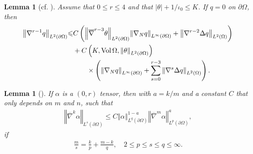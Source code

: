 \documentclass[12pt,reqno]{amsart}
\numberwithin{equation}{section}
\newtheorem{lemma}[theorem]{Lemma}
\theoremstyle{definition}
\theoremstyle{remark}
\begin{document}
\begin{lemma}[cf. \mbox{\cite[Proposition 5.10]{CL00}}] \label{lem.CL00prop5.10}
  Assume that $0{\leqslant} r{\leqslant} 4$ and that $|\theta|+1/\iota_0{\leqslant} K$. If $q=0$ on ${\partial}\Omega$, then
  \begin{align}
    {\left\Vert{{\nabla}^{r-1} q}\right\Vert}_{L^2({\partial}\Omega)} {\leqslant}& C\left({\left\Vert{{\overline{\nabla}}^{r-3}\theta}\right\Vert}_{L^2({\partial}\Omega)} {\left\Vert{{\nabla}_N q}\right\Vert}_{L^\infty({\partial}\Omega)}+{\left\Vert{{\nabla}^{r-2}\Delta q}\right\Vert}_{L^2(\Omega)}\right){\nonumber}\\
    &+C\left(K,{\mathrm{Vol}\,}\Omega,{\left\Vert{\theta}\right\Vert}_{L^2({\partial}\Omega)}\right){\nonumber}\\
    &\qquad\times\left({\left\Vert{{\nabla}_N q}\right\Vert}_{L^\infty({\partial}\Omega)}+\sum_{s=0}^{r-3} {\left\Vert{{\nabla}^s\Delta q}\right\Vert}_{L^2(\Omega)}\right).
  \end{align}
\end{lemma}

\begin{lemma}[\mbox{\cite[Lemma A.1]{CL00}}] \label{lem.CL00lemA.1}
    If $\alpha$ is a $(0,r)$ tensor, then with $a=k/m$ and a constant $C$ that only depends on $m$ and $n$, such that
  \begin{align}
    {\left\Vert{{\overline{\nabla}}^k\alpha}\right\Vert}_{L^s({\partial}\Omega)}{\leqslant} C{\left\Vert{\alpha}\right\Vert}_{L^q({\partial}\Omega)}^{1-a}{\left\Vert{{\overline{\nabla}}^m \alpha}\right\Vert}_{L^p({\partial}\Omega)}^a,
  \end{align}
  if
   \begin{align*}
     \frac{m}{s}=\frac{k}{p}+\frac{m-k}{q}, \quad 2{\leqslant} p{\leqslant} s{\leqslant} q{\leqslant} \infty.
   \end{align*}
\end{lemma}
\end{document}
